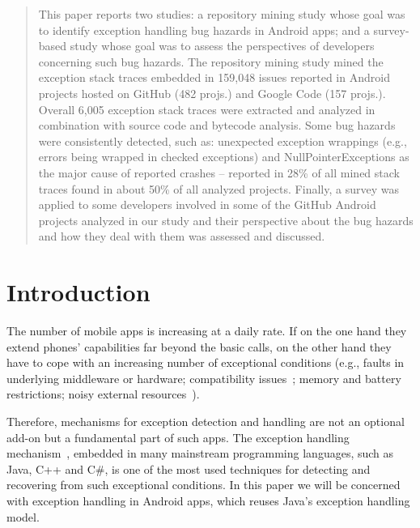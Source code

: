 \begin{abstract}
This paper reports two studies:  a repository mining study whose goal was to identify exception handling bug hazards in Android apps; and a survey-based study whose goal was to assess the perspectives of developers concerning such bug hazards. The repository mining study mined the exception stack traces embedded in 159,048 issues reported in Android projects hosted on GitHub (482 projs.)  and Google Code (157 projs.).  Overall 6,005 exception stack traces were extracted and analyzed in combination with source code and bytecode analysis. Some bug hazards were consistently detected, such as:  unexpected exception wrappings (e.g., errors being wrapped in checked exceptions) and NullPointerExceptions as the major cause of reported crashes -- reported in 28\% of all mined stack traces found in about 50\% of all analyzed projects. Finally, a survey was applied to some developers involved in some of the GitHub Android projects analyzed in our study and their perspective about the bug hazards and how they deal with them was assessed and discussed.

\end{abstract}

\section{Introduction}
\label{intro}


The number of mobile apps is increasing at a daily rate. If on the one hand they
extend phones' capabilities far beyond the basic calls, on the other hand they have to 
cope with an increasing number of exceptional conditions 
(e.g., faults in underlying middleware or hardware; compatibility issues~\cite{McDon13}; 
memory and battery restrictions; noisy external resources~\cite{Zhang12}). 

Therefore, mechanisms for exception detection and handling are not an optional add-on but a 
fundamental part of such apps. The exception handling mechanism~\cite{goodenough1975exception},
embedded in many mainstream programming languages, such as Java, C++ and C\#,
 is one of the most used techniques for detecting and recovering from such exceptional conditions.
In this paper we will be concerned with exception handling in Android apps,
which reuses Java's exception handling model.
 
